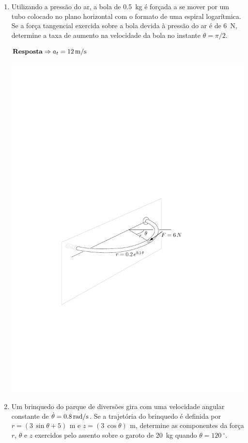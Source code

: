 \documentclass[a4paper,12pt]{article}
\begin{document}
\begin{enumerate}
		\newpage
		
		\item Utilizando a pressão do ar, a bola de \SI{0.5}{\kilogram} é forçada a se mover por um tubo colocado no plano horizontal com o formato de uma espiral logarítmica. Se a força tangencial exercida sobre a bola devida à pressão do ar é de \SI{6}{\newton}, determine a taxa de aumento na velocidade da bola no instante $\theta=\pi/2$. 
		
		$\textbf{\text{Resposta}}\Rightarrow a_{t}=\SI{12}{\meter/\second}$
		
		\vspace{-1cm}
		\begin{flushright}
			\includegraphics[scale=1]{images/draw_8.pdf}
		\end{flushright}
		
		\item Um brinquedo do parque de diversões gira com uma velocidade angular constante de $\dot{\theta}=\SI{0.8\,}{\radian/\second}$. Se a trajetória do brinquedo é definida por $r=(3\,\sin\theta + 5)\,\SI{}{\meter}$ e $z=(3\,\cos\theta)\,\SI{}{\meter}$, determine as
		componentes da força $r$, $\theta$ e $z$ exercidos pelo assento sobre o garoto de \SI{20}{\kilogram} quando $\theta=\SI{120}{^{\circ}}$.
		

\end{enumerate}
\end{document}
